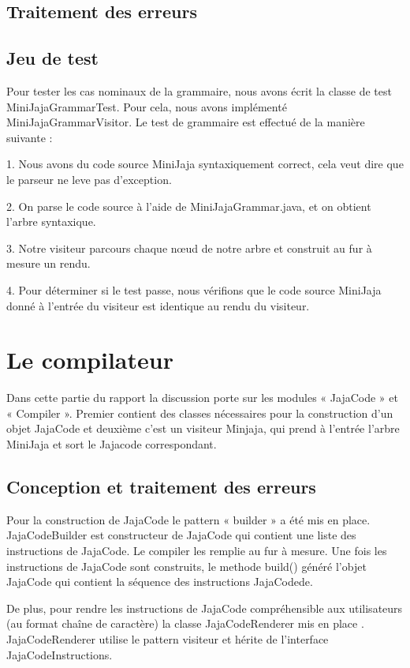 \documentclass[a4paper,12pt]{report}
\begin{document}
\subsection{Traitement des erreurs}
\subsection{Jeu de test}
Pour tester les cas nominaux de la grammaire, nous avons écrit la classe de test MiniJajaGrammarTest. Pour cela, nous avons implémenté MiniJajaGrammarVisitor. Le test de grammaire est effectué de la manière suivante : 

1. Nous avons du code source MiniJaja syntaxiquement correct, cela veut dire que le parseur ne leve pas d'exception.

2. On parse le code source à l'aide de MiniJajaGrammar.java, et on obtient l'arbre syntaxique. 

3. Notre visiteur parcours chaque nœud de notre arbre et construit au fur à mesure un rendu. 

4. Pour déterminer si le test passe, nous vérifions que le code source MiniJaja donné à l'entrée du visiteur est identique au rendu du visiteur.  

\section{Le compilateur}
Dans cette partie du rapport la discussion porte sur les modules  « JajaCode » et « Compiler ». Premier contient des classes nécessaires pour la construction d’un objet JajaCode et deuxième c’est un visiteur Minjaja, qui prend à l’entrée l’arbre MiniJaja et sort le Jajacode correspondant. 

\subsection{Conception et traitement des erreurs}
Pour la construction de JajaCode le pattern « builder » a été mis en place. JajaCodeBuilder est constructeur de JajaCode qui contient une liste des instructions de JajaCode. Le compiler les remplie au fur à mesure. Une fois les instructions de JajaCode sont construits, le methode build() généré l’objet JajaCode qui contient la séquence des instructions JajaCodede.
  
De plus, pour rendre les instructions de JajaCode compréhensible aux utilisateurs (au format chaîne de caractère) la classe JajaCodeRenderer mis en place . JajaCodeRenderer utilise le pattern visiteur et  hérite de l’interface JajaCodeInstructions. 
\end{document}
